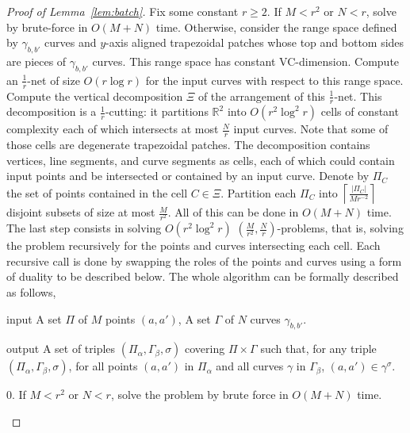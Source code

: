 \begin{proof}[Proof of Lemma~\ref{lem:batch}]
Fix some constant $r \geq 2$.
If $M < r^2$ or $N < r$, solve by brute-force in $O(M+N)$ time. Otherwise,
consider the range space defined by $\gamma_{b,b'}$ curves and $y$-axis aligned
trapezoidal patches whose top and bottom sides are pieces of $\gamma_{b,b'}$
curves. This range space has constant VC-dimension.
Compute an $\frac 1r$-net of size $O(r \log r)$ for the input curves with respect to
this range space. Compute the vertical decomposition \(\Xi\) of the arrangement
of this $\frac 1r$-net. This decomposition is a $\frac 1r$-cutting: it partitions
$\mathbb{R}^2$ into $O(r^2 \log^2 r)$ cells of constant complexity each of
which intersects at most \(\frac{N}{r}\) input curves.
Note that some of those cells are degenerate trapezoidal
patches. The decomposition contains vertices, line segments, and curve
segments as cells, each of which could contain input points and be intersected
or contained by an input curve.
Denote by \(\Pi_C\) the set of points contained in the cell \(C \in \Xi\).
Partition each \(\Pi_C\) into \(\left\lceil \frac{\lvert \Pi_C \rvert}{M
r^{-2}} \right\rceil\) disjoint subsets of size at most \(\frac{M}{r^2}\). All
of this can be done in \(O(M+N)\) time.
The last step consists in solving \(O(r^2 \log^2 r)\)
\((\frac{M}{r^2},\frac{N}{r})\)-problems, that is, solving the problem
recursively for the points and curves intersecting each cell.
Each recursive call is done by swapping the roles of the points and curves
using a form of duality to be described below.
The whole algorithm can be formally described as follows,
\begin{algorithm}\label{algo:pbrs}
\item[input] A set $\Pi$ of $M$ points $(a,a')$, A set $\Gamma$ of $N$ curves $\gamma_{b,b'}$.
\item[output] A set of triples $(\Pi_\alpha,\Gamma_\beta,\sigma)$ covering $\Pi \times \Gamma$
    such that, for any triple
    $(\Pi_\alpha,\Gamma_\beta,\sigma)$,
    for all points $(a,a')$ in $\Pi_\alpha$ and all curves $\gamma$ in
    $\Gamma_\beta$,
    $(a,a') \in \gamma^\sigma$.
\item[0.] If $M < r^2$ or $N < r$, solve the problem by brute force in $O(M+N)$ time.

\end{algorithm}
\end{proof}
